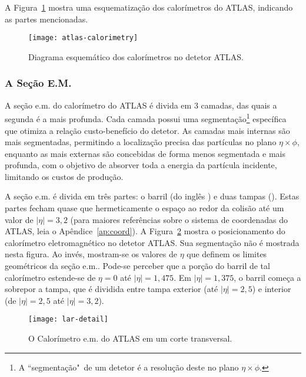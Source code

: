 A Figura~\ref{fig:calo-general} mostra uma esquematização dos calorímetros do
ATLAS, indicando as partes mencionadas.

\begin{figure}
\begin{center}
\texttt{[image: atlas-calorimetry]}
\end{center}
\caption{Diagrama esquemático dos calorímetros no detetor ATLAS.}
\label{fig:calo-general}
\end{figure}

\subsubsection{A Seção E.M.}

A seção e.m. do calorímetro do ATLAS é divida em 3 camadas, das quais a
segunda é a mais profunda. Cada camada possui uma segmentação\footnote{A
``segmentação"\ de um detetor é a resolução deste no plano $\eta\times\phi$.} 
específica que otimiza a relação custo-benefício do detetor. As camadas mais
internas são mais segmentadas, permitindo a localização precisa das partículas
no plano $\eta\times\phi$, enquanto as mais externas são concebidas de forma
menos segmentada e mais profunda, com o objetivo de absorver toda a energia da
partícula incidente, limitando os custos de produção.

A seção e.m. é divida em três partes: o barril (do inglês
) e duas tampas (). Estas partes fecham quase que
hermeticamente o espaço ao redor da colisão até um valor de $|\eta|=3,2$ (para
maiores referências sobre o sistema de coordenadas do ATLAS, leia o
Apêndice~\ref{ap:coord}). A Figura~\ref{fig:lar-pos} mostra o posicionamento
do calorímetro eletromagnético no detetor ATLAS. Sua segmentação não é
mostrada nesta figura. Ao invés, mostram-se os valores de $\eta$ que definem
os limites geométricos da seção e.m.. Pode-se perceber que a porção do barril
de tal calorímetro estende-se de $\eta=0$ até $|\eta|=1,475$. Em
$|\eta|=1,375$, o barril começa a sobrepor a tampa, que é dividida entre tampa
exterior (até $|\eta|=2,5$) e interior (de $|\eta|=2,5$ até $|\eta|=3,2$).

\begin{figure}
\begin{center}
\texttt{[image: lar-detail]}
\end{center}
\caption{O Calorímetro e.m. do ATLAS em um corte transversal.}
\label{fig:lar-pos}
\end{figure}

